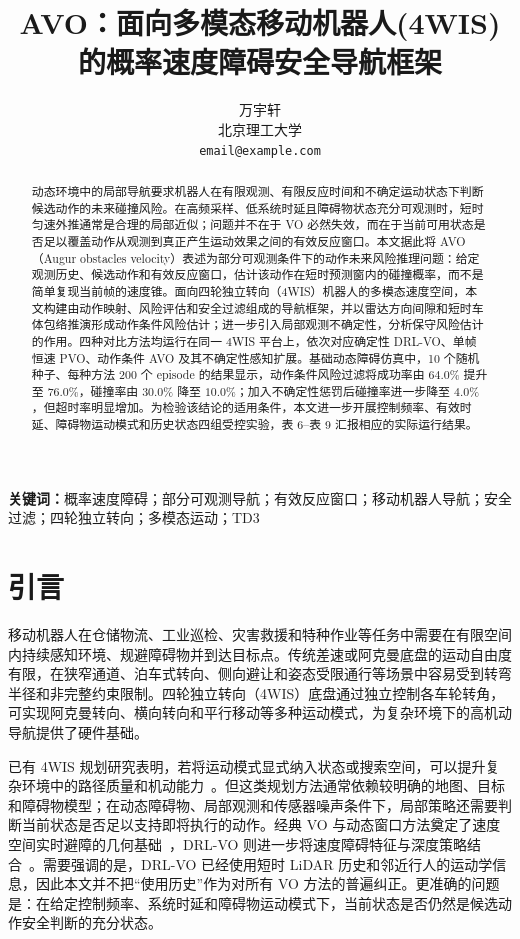 \documentclass[UTF8,10pt,a4paper,twocolumn]{ctexart}
\title{\textbf{AVO：面向多模态移动机器人(4WIS)的概率速度障碍安全导航框架}}
\author{万宇轩\\
北京理工大学\\
\texttt{email@example.com}}
\date{}
\begin{document}
\maketitle

\begin{abstract}
动态环境中的局部导航要求机器人在有限观测、有限反应时间和不确定运动状态下判断候选动作的未来碰撞风险。在高频采样、低系统时延且障碍物状态充分可观测时，短时匀速外推通常是合理的局部近似；问题并不在于 VO 必然失效，而在于当前可用状态是否足以覆盖动作从观测到真正产生运动效果之间的有效反应窗口。本文据此将 AVO（Augur obstacles velocity）表述为部分可观测条件下的动作未来风险推理问题：给定观测历史、候选动作和有效反应窗口，估计该动作在短时预测窗内的碰撞概率，而不是简单复现当前帧的速度锥。面向四轮独立转向（4WIS）机器人的多模态速度空间，本文构建由动作映射、风险评估和安全过滤组成的导航框架，并以雷达方向间隙和短时车体包络推演形成动作条件风险估计；进一步引入局部观测不确定性，分析保守风险估计的作用。四种对比方法均运行在同一 4WIS 平台上，依次对应确定性 DRL-VO、单帧恒速 PVO、动作条件 AVO 及其不确定性感知扩展。基础动态障碍仿真中，10 个随机种子、每种方法 200 个 episode 的结果显示，动作条件风险过滤将成功率由 $64.0\%$ 提升至 $76.0\%$，碰撞率由 $30.0\%$ 降至 $10.0\%$；加入不确定性惩罚后碰撞率进一步降至 $4.0\%$，但超时率明显增加。为检验该结论的适用条件，本文进一步开展控制频率、有效时延、障碍物运动模式和历史状态四组受控实验，表 6--表 9 汇报相应的实际运行结果。
\end{abstract}

\textbf{关键词：}概率速度障碍；部分可观测导航；有效反应窗口；移动机器人导航；安全过滤；四轮独立转向；多模态运动；TD3

\section{引言}

移动机器人在仓储物流、工业巡检、灾害救援和特种作业等任务中需要在有限空间内持续感知环境、规避障碍物并到达目标点。传统差速或阿克曼底盘的运动自由度有限，在狭窄通道、泊车式转向、侧向避让和姿态受限通行等场景中容易受到转弯半径和非完整约束限制。四轮独立转向（4WIS）底盘通过独立控制各车轮转角，可实现阿克曼转向、横向转向和平行移动等多种运动模式，为复杂环境下的高机动导航提供了硬件基础。

已有 4WIS 规划研究表明，若将运动模式显式纳入状态或搜索空间，可以提升复杂环境中的路径质量和机动能力~\cite{bao2025hybrid}。但这类规划方法通常依赖较明确的地图、目标和障碍物模型；在动态障碍物、局部观测和传感器噪声条件下，局部策略还需要判断当前状态是否足以支持即将执行的动作。经典 VO 与动态窗口方法奠定了速度空间实时避障的几何基础~\cite{fiorini1998vo,fox1997dwa}，DRL-VO 则进一步将速度障碍特征与深度策略结合~\cite{xie2023drlvo}。需要强调的是，DRL-VO 已经使用短时 LiDAR 历史和邻近行人的运动学信息，因此本文并不把“使用历史”作为对所有 VO 方法的普遍纠正。更准确的问题是：在给定控制频率、系统时延和障碍物运动模式下，当前状态是否仍然是候选动作安全判断的充分状态。
\end{document}
